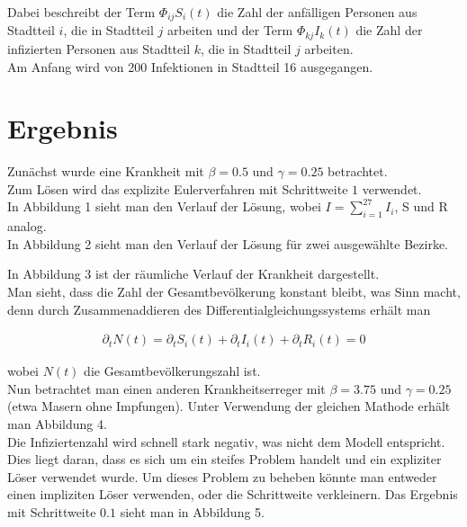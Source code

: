 \documentclass[11pt,a4paper]{article}
\begin{document}
Dabei beschreibt der Term $\Phi_{ij}S_i(t)$ die Zahl der anf\"alligen Personen aus Stadtteil $i$, die in Stadtteil $j$ arbeiten und der Term $\Phi_{kj}I_k(t)$ die Zahl der infizierten Personen aus Stadtteil $k$, die in Stadtteil $j$ arbeiten.\\

Am Anfang wird von 200 Infektionen in Stadtteil 16 ausgegangen.
  
  \section*{Ergebnis}
  
  Zun\"achst wurde eine Krankheit mit $\beta = 0.5$ und $\gamma = 0.25$ betrachtet.\\
  Zum L\"osen wird das explizite Eulerverfahren mit Schrittweite $1$ verwendet.\\
  

In Abbildung 1 sieht man den Verlauf der L\"osung, wobei $I=\sum_{i=1}^{27}I_i$, S und R analog.\\

In Abbildung 2 sieht man den Verlauf der L\"osung f\"ur zwei ausgew\"ahlte Bezirke.

In Abbildung 3 ist der r\"aumliche Verlauf der Krankheit dargestellt.\\

Man sieht, dass die Zahl der Gesamtbev\"olkerung konstant bleibt, was Sinn macht, denn durch Zusammenaddieren des Differentialgleichungssystems erh\"alt man

\begin{align*}
\partial_tN(t)=\partial_tS_i(t)+\partial_tI_i(t)+\partial_tR_i(t)=0
\end{align*}

wobei $N(t)$ die Gesamtbev\"olkerungszahl ist.\\

Nun betrachtet man einen anderen Krankheitserreger mit $\beta = 3.75$ und $\gamma = 0.25$ (etwa Masern ohne Impfungen). Unter Verwendung der gleichen Mathode erh\"alt man Abbildung 4.\\

Die Infiziertenzahl wird schnell stark negativ, was nicht dem Modell entspricht. Dies liegt daran, dass es sich um ein steifes Problem handelt und ein expliziter L\"oser verwendet wurde. Um dieses Problem zu beheben k\"onnte man entweder einen impliziten L\"oser verwenden, oder die Schrittweite verkleinern. Das Ergebnis mit Schrittweite $0.1$ sieht man in Abbildung 5.
  
\end{document}

